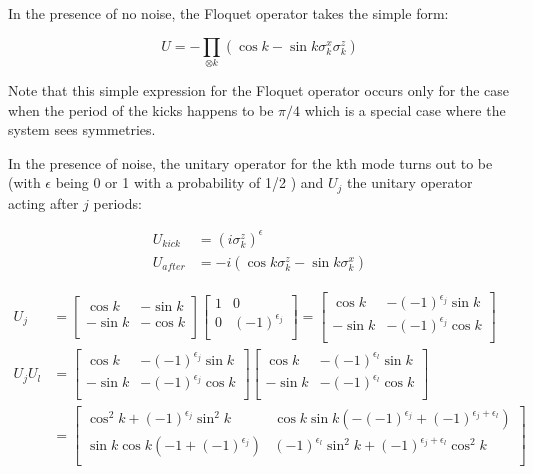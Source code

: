 \documentclass[11pt,a4paper]{article}
\begin{document}
 	In the presence of no noise, the Floquet operator takes the simple form: 
 	
 	\begin{equation}\label{key}
 	U = - \prod_{\otimes k} (\cos k - \sin k \sigma_{k}^x \sigma_{k}^z)
  	\end{equation}
  	
  	Note that this simple expression for the Floquet operator occurs only for the case when the period of the kicks happens to be $ \pi/4 $ which is a special case where the system sees symmetries. 
  	
  	
  	In the presence of noise, the unitary operator for the kth mode  turns out to be (with $ \epsilon $ being 0 or 1 with a probability of 1/2 ) and $ U_{j} $  the unitary operator acting after $ j $ periods\cite{PhysRevB.98.064305}: 
  	
  	\begin{align}
  	U_{kick} &= (i\sigma_{k}^z)^\epsilon\\
  	U_{after}& =  -i  (\cos k \sigma_{k}^z - \sin k \sigma_{k}^x )
  	\end{align}
  	
  	\begin{align}
  	U_{j} &=   \begin{bmatrix}
  	\cos k & -\sin k\\
  	-\sin k & -\cos k \\ 
  	\end{bmatrix} \begin{bmatrix}
  	1& 0 \\
  	0 & (-1)^{\epsilon_{j}}\\
  	\end{bmatrix} =  \begin{bmatrix}
  	\cos k & -(-1)^{\epsilon_{j}}\sin k \\
  	-\sin k & -(-1)^{\epsilon_{j}}\cos k \\  
  	\end{bmatrix}\\
   	U_{j}U_{l} 	&=  \begin{bmatrix}
  	\cos k & -(-1)^{\epsilon_{j}}\sin k \\
  	-\sin k & -(-1)^{\epsilon_{j}}\cos k \\  
  	\end{bmatrix}  \begin{bmatrix}
  	\cos k & -(-1)^{\epsilon_{l}}\sin k \\
  	-\sin k & -(-1)^{\epsilon_{l}}\cos k \\  
  	\end{bmatrix}\\
  	& = \begin{bmatrix}
  	\cos^2 k + (-1)^{\epsilon_{j}}\sin^2 k & \cos k \sin k(-(-1)^{\epsilon_{j}} + (-1)^{\epsilon_{j}+\epsilon_{l}})\\
  	\sin k \cos k (-1 + (-1)^{\epsilon_{j}})& (-1)^{\epsilon_{l}}\sin^2 k + (-1)^{\epsilon_{j}+\epsilon_{l}}\cos^2  k\\
  	\end{bmatrix}
    	\end{align}
 	
\end{document}
